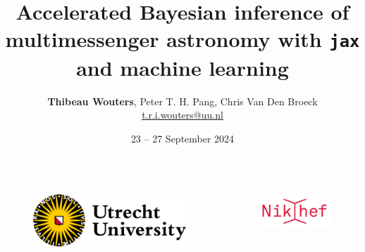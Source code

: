 \documentclass[usenames,dvipsnames,t]{beamer}
\title[XMXS] %
{Accelerated Bayesian inference of multimessenger astronomy with \texttt{jax} and machine learning}
\author[Thibeau Wouters]{\small{\textbf{Thibeau Wouters}, Peter T. H. Pang, Chris Van Den Broeck} \\ \vspace{2mm} \href{mailto:t.r.i.wouters@uu.nl}{t.r.i.wouters@uu.nl} \newline \github \quad \linkedin \quad \twitter} %
\date{23 -- 27 September 2024}
\begin{document}
{

  
\begin{frame}
\titlepage

\begin{columns}
  \begin{figure}
    \centering
    \vspace{1.5mm}
    \includegraphics[width=0.75\linewidth]{Figures/utrecht-university.png}
  \end{figure}
  \begin{figure}
    \centering
    \includegraphics[width=0.75\linewidth]{Figures/Nikhef_logo-transparent.png}
  \end{figure}
\end{columns}

\end{frame}
}
\end{document}
